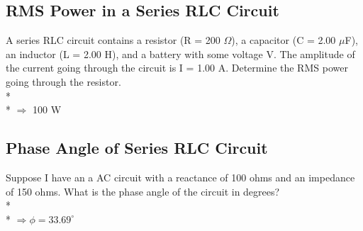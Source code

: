 \documentclass[11pt]{article}
\begin{document}
\subsection{RMS Power in a Series RLC Circuit}
A series RLC circuit contains a resistor (R = 200 $\Omega$), a capacitor (C = 2.00 $\mu$F), an inductor (L = 2.00 H), and a battery with some voltage V.  The amplitude of the current going through the circuit is I = 1.00 A.  Determine the RMS power going through the resistor. \\* \\*
$\Rightarrow $ 100 W

\subsection{Phase Angle of Series RLC Circuit}
Suppose I have an a AC circuit with a reactance of 100 ohms and an impedance of 150 ohms. What is the phase angle of the circuit in degrees? \\* \\*
$\Rightarrow \phi = 33.69^\circ$

\end{document}
